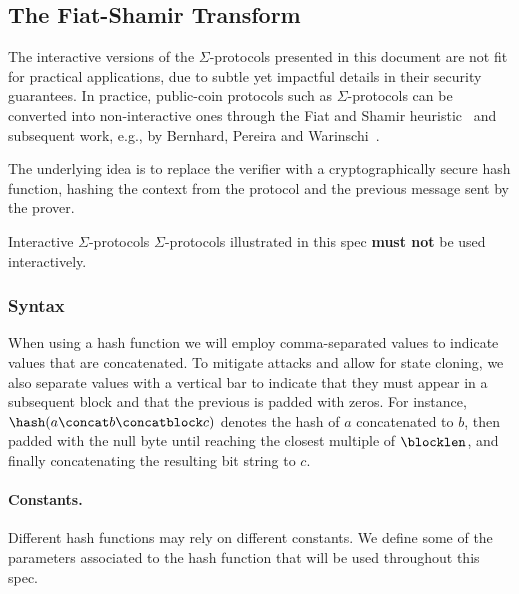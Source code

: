 \documentclass[11pt]{article}
\begin{document}
\subsection{The Fiat-Shamir Transform}\label{sec:fs}

The interactive versions of the $\Sigma$-protocols presented in this document are not fit for practical applications, due to subtle yet impactful details in their security guarantees.
In practice, public-coin protocols such as $\Sigma$-protocols can be converted into non-interactive ones through the
Fiat and Shamir heuristic~\cite{C:FiaSha86} and subsequent work, e.g., by Bernhard, Pereira and Warinschi~\cite{AC:BerPerWar12}.

The underlying idea is to replace the verifier with a cryptographically secure hash function, hashing the context from the protocol and the previous message sent by the prover.

\begin{warning}{Interactive $\Sigma$-protocols}{} $\Sigma$-protocols illustrated in this spec \textbf{must not} be used interactively.
\end{warning}

\subsubsection{Syntax}

When using a hash function we will employ comma-separated values to indicate values that are concatenated.
To mitigate attacks and allow for state cloning, we also separate values with a vertical bar
to indicate that they must appear in a subsequent block and that the previous is padded with zeros. For instance, $\hash(a \concat b \concatblock c)$ denotes the hash of $a$ concatenated to $b$, then padded with the null byte until reaching the closest multiple of $\blocklen$, and finally concatenating the resulting bit string to $c$.


\paragraph{Constants.} Different hash functions may rely on different constants.
We define some of the parameters associated to the hash function that will be used throughout this spec.
\end{document}

